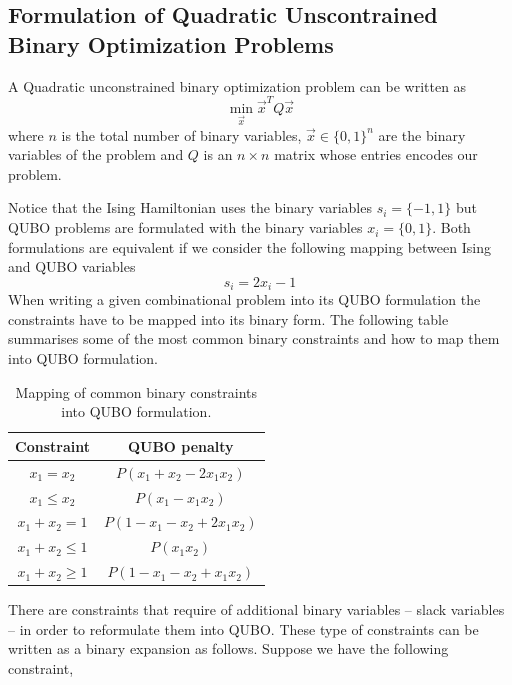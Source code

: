 \subsection{Formulation of Quadratic Unscontrained Binary Optimization Problems}
\begin{definition}
   A Quadratic unconstrained binary optimization problem can be written as
\begin{equation}
    \min_{\vec{x}}\vec{x}^{T}Q\vec{x}
\end{equation}
where $n$ is the total number of binary variables, $\vec{x}\in\{0,1\}^{n}$ are the binary variables of the problem and $Q$ is an $n\times n$ matrix whose entries encodes our problem.
\end{definition}
Notice that the Ising Hamiltonian uses the binary variables $s_{i} = \{-1,1\}$ but QUBO problems are formulated with the binary variables $x_{i} = \{0,1\}$. Both formulations are equivalent if we consider the following mapping between Ising and QUBO variables
\begin{equation}
    s_{i} = 2x_{i} -1
\end{equation}
When writing a given combinational problem into its QUBO formulation the constraints have to be mapped into its binary form. The following table summarises some of the most common binary constraints and how to map them into QUBO formulation.
\begin{table}[H]
\centering
\begin{tabular}{ |c||c| }
 \hline
 \textbf{Constraint} & \textbf{QUBO penalty} \\
 \hline
 $x_{1}=x_{2}$ & $P\left(x_{1} + x_{2} -2x_{1}x_{2}\right)$  \\
 $x_{1}\leq x_{2}$ &  $P\left(x_{1} -x_{1}x_{2}\right)$   \\
 $x_{1} + x_{2} = 1$ & $P\left(1-x_{1}-x_{2}+2x_{1}x_{2}\right)$ \\
 $x_{1} + x_{2} \leq 1$    & $P\left(x_{1}x_{2}\right)$ \\
$x_{1} + x_{2} \geq 1$ &   $P\left(1-x_{1}-x_{2}+x_{1}x_{2}\right)$ \\
 \hline
\end{tabular}
\caption{Mapping of common binary constraints into QUBO formulation.}
\end{table}
There are constraints that require of additional binary variables -- slack variables -- in order to reformulate them into QUBO. These type of constraints can be written as a binary expansion as follows. Suppose we have the following constraint,
